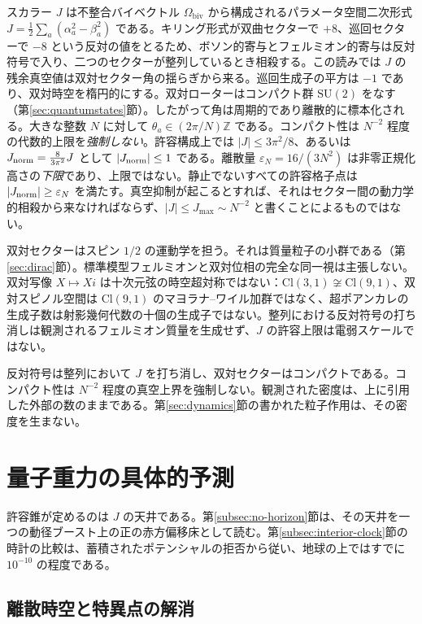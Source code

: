 \documentclass[a4paper]{article}
\begin{document}
スカラー \(J\) は不整合バイベクトル \(\Omega_\text{biv}\) から構成されるパラメータ空間二次形式 \(J=\frac12\sum_a(\alpha_a^2-\beta_a^2)\) である。キリング形式が双曲セクターで \(+8\)、巡回セクターで \(-8\) という反対の値をとるため、ボソン的寄与とフェルミオン的寄与は反対符号で入り、二つのセクターが整列しているとき相殺する。この読みでは \(J\) の残余真空値は双対セクター角の揺らぎから来る。巡回生成子の平方は \(-1\) であり、双対時空を楕円的にする。双対ローターはコンパクト群 \(\mathrm{SU}(2)\) をなす（第\ref{sec:quantumstates}節）。したがって角は周期的であり離散的に標本化される。大きな整数 \(N\) に対して \(\theta_a \in (2\pi/N)\mathbb{Z}\) である。コンパクト性は \(N^{-2}\) 程度の代数的上限を\emph{強制しない}。許容構成上では \(|J|\le 3\pi^2/8\)、あるいは \(J_{\rm norm}=\frac8{3\pi^2}J\) として \(|J_{\rm norm}|\le 1\) である。離散量 \(\varepsilon_N=16/(3N^2)\) は非零正規化高さの\emph{下限}であり、上限ではない。静止でないすべての許容格子点は \(|J_{\rm norm}|\ge\varepsilon_N\) を満たす。真空抑制が起こるとすれば、それはセクター間の動力学的相殺から来なければならず、\(|J|\le J_{\max}\sim N^{-2}\) と書くことによるものではない。

双対セクターはスピン $1/2$ の運動学を担う。それは質量粒子の小群である（第\ref{sec:dirac}節）。標準模型フェルミオンと双対位相の完全な同一視は主張しない。双対写像 $X\mapsto Xi$ は十次元弦の時空超対称ではない：$\mathrm{Cl}(3,1)\not\cong\mathrm{Cl}(9,1)$、双対スピノル空間は $\mathrm{Cl}(9,1)$ のマヨラナ--ワイル加群ではなく、超ポアンカレの生成子数は射影幾何代数の十個の生成子ではない。整列における反対符号の打ち消しは観測されるフェルミオン質量を生成せず、\(J\) の許容上限は電弱スケールではない。

反対符号は整列において \(J\) を打ち消し、双対セクターはコンパクトである。コンパクト性は \(N^{-2}\) 程度の真空上界を強制しない。観測された密度は、上に引用した外部の数のままである。第\ref{sec:dynamics}節の書かれた粒子作用は、その密度を生まない。

\section{量子重力の具体的予測}
\label{sec:predictions}

許容錐が定めるのは \(J\) の天井である。第\ref{subsec:no-horizon}節は、その天井を一つの動径ブースト上の正の赤方偏移床として読む。第\ref{subsec:interior-clock}節の時計の比較は、蓄積されたポテンシャルの拒否から従い、地球の上ではすでに \(10^{-10}\) の程度である。

\subsection{離散時空と特異点の解消}
\end{document}
